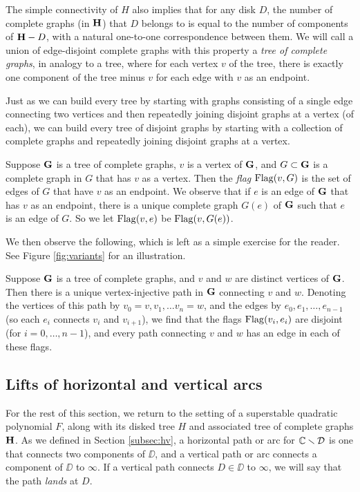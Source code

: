 The simple connectivity of $H$ also implies that for any disk $D$,
the number of complete graphs (in ${\mathbf{H}}$) that $D$ belongs to is equal to the number of components of ${\mathbf{H}} - D$, 
with a natural one-to-one correspondence between them.
We will call a union of edge-disjoint complete graphs with this property a \emph{tree of complete graphs}, in analogy to a tree, 
where for each vertex $v$ of the tree, there is exactly one component of the tree minus $v$ for each edge with $v$ as an endpoint.

Just as we can build every tree by starting with graphs consisting of a single edge connecting two vertices and then repeatedly joining disjoint graphs at a vertex (of each),
we can build every tree of disjoint graphs by starting with a collection of complete graphs and repeatedly joining disjoint graphs at a vertex. 

Suppose ${\mathbf{G}}$ is a tree of complete graphs,
$v$ is a vertex of ${\mathbf{G}}$, and $G \subset {\mathbf{G}}$ is a complete graph in $G$ that has $v$ as a vertex.
Then the \emph{flag} $\operatorname{Flag}(v, G)$ is the set of edges of $G$ that have $v$ as an endpoint.
We observe that if $e$ is an edge of ${\mathbf{G}}$ that has $v$ as an endpoint, 
there is a unique complete graph $G(e)$ of ${\mathbf{G}}$ such that $e$ is an edge of $G$.
So we let $\operatorname{Flag}(v, e)$ be $\operatorname{Flag}(v, G(e))$. 

We then observe the following, which is left as a simple exercise for the reader.
See Figure \ref{fig:variants} for an illustration.
\begin{lemma}\label{lem:into-flags}
Suppose ${\mathbf{G}}$ is a tree of complete graphs,
and $v$ and $w$ are distinct vertices of ${\mathbf{G}}$.
Then there is a unique vertex-injective path in ${\mathbf{G}}$ connecting $v$ and $w$.
Denoting the vertices of this path by $v_0 = v, v_1, \ldots v_n = w$,
and the edges by $e_0, e_1, \ldots, e_{n-1}$ (so each $e_i$ connects $v_i$ and $v_{i+1}$),
we find that the flags $\operatorname{Flag}(v_i, e_i)$ are disjoint (for $i = 0,\ldots, n-1$),
and every path connecting $v$ and $w$ has an edge in each of these flags. 
\end{lemma}






\subsection{Lifts of horizontal and vertical arcs}
For the rest of this section,
we return to the setting of a superstable quadratic polynomial $F$,
along with its disked tree $H$ and associated tree of complete graphs ${\mathbf{H}}$. 
As we defined in Section \ref{subsec:hv},
a horizontal path or arc for ${\Bbb C} \smallsetminus {\mathcal D}$ is one that connects two components of $\DD$,
and a vertical path or arc connects a component of $\DD$ to $\infty$. 
If a vertical path connects $D \in \DD$ to $\infty$, we will say that the path \emph{lands} at $D$. 

